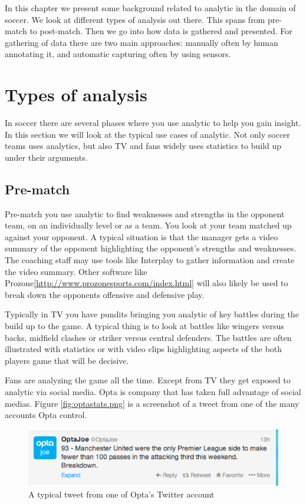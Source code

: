 In this chapter we present some background related to analytic in the domain of soccer. We look at different types of analysis out there. This spans from pre-match to post-match. Then we go into how data is gathered and presented. For gathering of data there are two main approaches: manually often by human annotating it, and automatic capturing often by using sensors.

\section{Types of analysis}

In soccer there are several phases where you use analytic to help you gain insight.  In this section we will look at the typical use cases of analytic. Not only soccer teams uses analytics, but also TV and fans widely uses statistics to build up under their arguments.

\subsection{Pre-match}

Pre-match you use analytic to find weaknesses and strengths in the opponent team, on an individually level or as a team. You look at your team matched up against your opponent. A typical situation is that the manager gets a video summary of the opponent highlighting the opponent’s strengths and weaknesses. The coaching staff may use tools like Interplay to gather information and create the video summary. Other software like Prozone\ref{http://www.prozonesports.com/index.html} will also likely be used to break down the opponents offensive and defensive play. 

Typically in TV you have pundits bringing you analytic of key battles during the build up to the game. A typical thing is to look at battles like wingers versus backs, midfield clashes or striker versus central defenders. The battles are often illustrated with statistics or with video clips highlighting aspects of the both players game that will be decisive. 

Fans are analyzing the game all the time. Except from TV they get exposed to analytic via social media. Opta is company that has taken full advantage of social medias. Figure \ref{fig:optastats.png} is a screenshot of a tweet from one of the many accounts Opta control. 

\begin{figure}[ht!]
\centering
\includegraphics[width=1\textwidth]{images/general/optastats.png}
\caption{A typical tweet from one of Opta's Twitter account}
\label{fig:optastats}
\end{figure}

